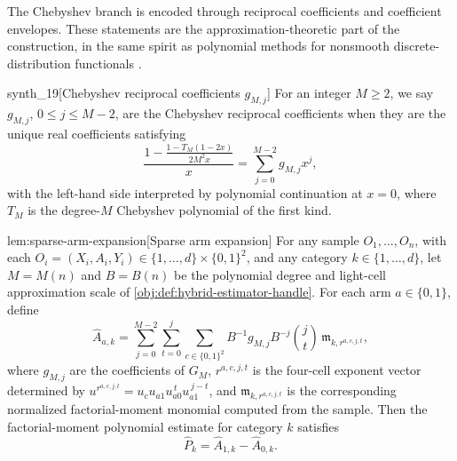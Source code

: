\documentclass[11pt]{article}
\begin{document}
The Chebyshev branch is encoded through reciprocal coefficients and coefficient envelopes. These statements are the approximation-theoretic part of the construction, in the same spirit as polynomial methods for nonsmooth discrete-distribution functionals \citep{JiaoVenkatHanWeissman2015,WuYang2016,HanJiaoWeissman2020}.

\begin{definitionv}{synth_19}[Chebyshev reciprocal coefficients \(g_{M,j}\)]
For an integer \(M\ge2\), we say \(g_{M,j}\), \(0\le j\le M-2\), are the Chebyshev reciprocal coefficients when they are the unique real coefficients satisfying \[\frac{1-\frac{1-T_M(1-2x)}{2M^2x}}{x}=\sum_{j=0}^{M-2}g_{M,j}x^j,\] with the left-hand side interpreted by polynomial continuation at \(x=0\), where \(T_M\) is the degree-\(M\) Chebyshev polynomial of the first kind.
\end{definitionv}

\begin{lemmav}{lem:sparse-arm-expansion}[Sparse arm expansion]
For any sample \(O_1,\ldots,O_n\), with each \(O_i=(X_i,A_i,Y_i)\in\{1,\ldots,d\}\times\{0,1\}^2\), and any category \(k\in\{1,\ldots,d\}\), let \(M=M(n)\) and \(B=B(n)\) be the polynomial degree and light-cell approximation scale of \cref{obj:def:hybrid-estimator-handle}.  For each arm \(a\in\{0,1\}\), define
\[
\widehat A_{a,k}
=
\sum_{j=0}^{M-2}\sum_{t=0}^{j}\sum_{c\in\{0,1\}^2}
B^{-1} g_{M,j} B^{-j}\binom jt\,
\mathfrak m_{k,r^{a,c,j,t}},
\]
where \(g_{M,j}\) are the coefficients of \(G_M\), \(r^{a,c,j,t}\) is the four-cell exponent vector determined by
\(u^{r^{a,c,j,t}}=u_cu_{a1}u_{a0}^{\,t}u_{a1}^{\,j-t}\), and \(\mathfrak m_{k,r^{a,c,j,t}}\) is the corresponding normalized factorial-moment monomial computed from the sample.  Then the factorial-moment polynomial estimate for category \(k\) satisfies
\[
\widehat P_k=\widehat A_{1,k}-\widehat A_{0,k}.
\]
\end{lemmav}
\end{document}
